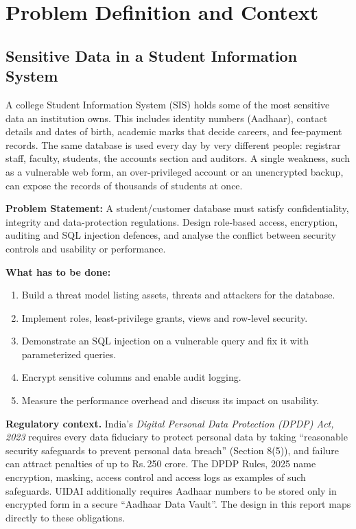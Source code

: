 \documentclass[11pt,a4paper]{report}
\begin{document}
\tableofcontents
\newpage


\section{Problem Definition and Context}

\subsection{Sensitive Data in a Student Information System}
A college Student Information System (SIS) holds some of the most sensitive data an institution owns. This includes identity numbers (Aadhaar), contact details and dates of birth, academic marks that decide careers, and fee-payment records. The same database is used every day by very different people: registrar staff, faculty, students, the accounts section and auditors. A single weakness, such as a vulnerable web form, an over-privileged account or an unencrypted backup, can expose the records of thousands of students at once.

\textbf{Problem Statement:} A student/customer database must satisfy confidentiality, integrity and data-protection regulations. Design role-based access, encryption, auditing and SQL injection defences, and analyse the conflict between security controls and usability or performance.

\textbf{What has to be done:}
\begin{enumerate}
    \item Build a threat model listing assets, threats and attackers for the database.
    \item Implement roles, least-privilege grants, views and row-level security.
    \item Demonstrate an SQL injection on a vulnerable query and fix it with parameterized queries.
    \item Encrypt sensitive columns and enable audit logging.
    \item Measure the performance overhead and discuss its impact on usability.
\end{enumerate}

\textbf{Regulatory context.} India's \emph{Digital Personal Data Protection (DPDP) Act, 2023} requires every data fiduciary to protect personal data by taking ``reasonable security safeguards to prevent personal data breach'' (Section 8(5)), and failure can attract penalties of up to Rs.\,250 crore. The DPDP Rules, 2025 name encryption, masking, access control and access logs as examples of such safeguards. UIDAI additionally requires Aadhaar numbers to be stored only in encrypted form in a secure ``Aadhaar Data Vault''. The design in this report maps directly to these obligations.
\end{document}
